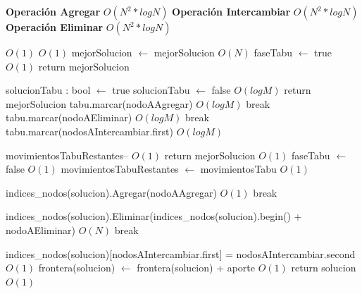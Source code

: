 \documentclass[a4paper, 10pt, twoside]{article}
\newenvironment{pseudo}[1][]{%
    \vspace{1em}%
    \begin{algorithmic}%
}
{%
    \end{algorithmic}%
    \vspace{1em}%
}
\newcommand{\Ode}[1]{\hfill $O(#1)$}
\begin{document}
\begin{pseudo}
		\State
		\State \textbf{Operación Agregar}															\Ode{N^2 * log N}
		\State
		\State \textbf{Operación Intercambiar}														\Ode{N^2 * log N}
		\State
		\State \textbf{Operación Eliminar}															\Ode{N^2 * log N}
		\State

																					\Ode{1}
																						\Ode{1}
					\State mejorSolucion $\leftarrow$ mejorSolucion 								\Ode{N}
					\State faseTabu $\leftarrow$ true 												\Ode{1}
				\EndIf
				\State
				 return mejorSolucion \EndIf

				\State solucionTabu : bool $\leftarrow$ true
					 solucionTabu $\leftarrow$ false \EndIf \Ode{log M}
				\EndFor
				\State
				 return mejorSolucion \EndIf
				\State
					    \State tabu.marcar(nodoAAgregar)										 	\Ode{log M}	
					    \State break
					\EndCase
						\State  tabu.marcar(nodoAEliminar) 											\Ode{log M}
						\State break
					\EndCase
						\State tabu.marcar(nodosAIntercambiar.first)								\Ode{log M}
					\EndCase
				\EndSwitch

				\State movimientosTabuRestantes--													\Ode{1}
				 return mejorSolucion
				\EndIf
			\Else
				          \Ode{1}
					\State faseTabu $\leftarrow$ false 												\Ode{1}
					\State movimientosTabuRestantes $\leftarrow$ movimientosTabu 					\Ode{1}
				\EndIf
			\EndIf


			    \State indices\_nodos(solucion).Agregar(nodoAAgregar) 								\Ode{1}
			    \State break
		    \EndCase

			    \State indices\_nodos(solucion).Eliminar(indices\_nodos(solucion).begin() + nodoAEliminar) \Ode{N}
			    \State break
		    \EndCase

			    \State indices\_nodos(solucion)[nodosAIntercambiar.first] = nodosAIntercambiar.second    \Ode{1}
		    \EndCase
		\EndSwitch
		\State
		\State frontera(solucion) $\leftarrow$ frontera(solucion) + aporte 								\Ode{1}
	\EndWhile
	\State return solucion 																			\Ode{1}


\end{pseudo}
\end{document}
